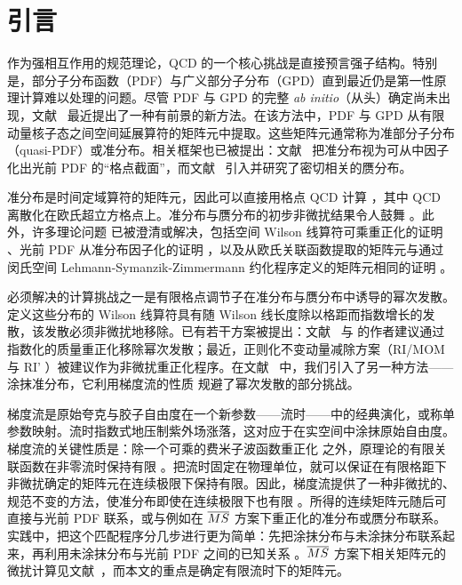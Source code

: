 \section{引言}

作为强相互作用的规范理论，QCD 的一个核心挑战是直接预言强子结构。特别是，部分子分布函数（PDF）与广义部分子分布（GPD）直到最近仍是第一性原理计算难以处理的问题。尽管 PDF 与 GPD 的完整 \textit{ab initio}（从头）确定尚未出现，文献~\cite{Ji:2013dva} 最近提出了一种有前景的新方法。在该方法中，PDF 与 GPD 从有限动量核子态之间空间延展算符的矩阵元中提取。这些矩阵元通常称为准部分子分布（quasi-PDF）或准分布。相关框架也已被提出：文献~\cite{Ma:2014jla,Ma:2014jga,Ma:2017pxb} 把准分布视为可从中因子化出光前 PDF 的``格点截面''，而文献~\cite{Radyushkin:2016hsy,Radyushkin:2017cyf,Orginos:2017kos} 引入并研究了密切相关的赝分布。

准分布是时间定域算符的矩阵元，因此可以直接用格点 QCD 计算 \cite{Carlson:2017gpk,Briceno:2017cpo}，其中 QCD 离散化在欧氏超立方格点上。准分布与赝分布的初步非微扰结果令人鼓舞 \cite{Lin:2014zya,Alexandrou:2015rja,Chen:2016utp,Orginos:2017kos,Zhang:2017bzy,Alexandrou:2017qpu}。此外，许多理论问题 \cite{Li:2016amo,Rossi:2017muf,Carlson:2017gpk} 已被澄清或解决，包括空间 Wilson 线算符可乘重正化的证明 \cite{Ji:2017oey,Ishikawa:2017faj}、光前 PDF 从准分布因子化的证明 \cite{Ma:2014jla,Ma:2014jga}，以及从欧氏关联函数提取的矩阵元与通过闵氏空间 Lehmann-Symanzik-Zimmermann 约化程序定义的矩阵元相同的证明 \cite{Briceno:2017cpo,Xiong:2017jtn,Ji:2017rah}。

必须解决的计算挑战之一是有限格点调节子在准分布与赝分布中诱导的幂次发散。定义这些分布的 Wilson 线算符具有随 Wilson 线长度除以格距而指数增长的发散，该发散必须非微扰地移除。已有若干方案被提出：文献~\cite{Chen:2016fxx} 与 \cite{Ishikawa:2016znu} 的作者建议通过指数化的质量重正化移除幂次发散；最近，正则化不变动量减除方案（RI/MOM \cite{Chen:2017mzz} 与 RI' \cite{Alexandrou:2017huk}）被建议作为非微扰重正化程序。在文献~\cite{Monahan:2016bvm} 中，我们引入了另一种方法——涂抹准分布，它利用梯度流的性质 \cite{Narayanan:2006rf,Luscher:2011bx,Luscher:2013cpa} 规避了幂次发散的部分挑战。

梯度流是原始夸克与胶子自由度在一个新参数——流时——中的经典演化，或称单参数映射。流时指数式地压制紫外场涨落，这对应于在实空间中涂抹原始自由度。梯度流的关键性质是：除一个可乘的费米子波函数重正化 \cite{Luscher:2013cpa} 之外，原理论的有限关联函数在非零流时保持有限 \cite{Luscher:2011bx}。把流时固定在物理单位，就可以保证在有限格距下非微扰确定的矩阵元在连续极限下保持有限。因此，梯度流提供了一种非微扰的、规范不变的方法，使准分布即使在连续极限下也有限 \cite{Monahan:2016bvm}。所得的连续矩阵元随后可直接与光前 PDF 联系，或与例如在 $\overline{MS}$ 方案下重正化的准分布或赝分布联系。实践中，把这个匹配程序分几步进行更为简单：先把涂抹分布与未涂抹分布联系起来，再利用未涂抹分布与光前 PDF 之间的已知关系 \cite{Xiong:2013bka,Ji:2015jwa,Wang:2017qyg,Stewart:2017tvs}。$\overline{MS}$ 方案下相关矩阵元的微扰计算见文献~\cite{Constantinou:2017sej}，而本文的重点是确定有限流时下的矩阵元。

